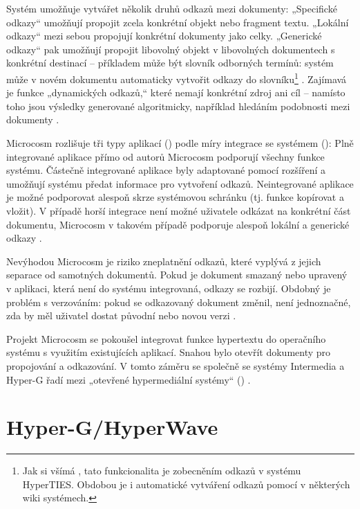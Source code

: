 Systém umožňuje vytvářet několik druhů odkazů mezi dokumenty: „Specifické odkazy“ umožňují propojit zcela konkrétní objekt nebo fragment  textu. „Lokální odkazy“ mezi sebou propojují konkrétní dokumenty jako celky. „Generické odkazy“ pak umožňují propojit libovolný objekt v libovolných dokumentech s konkrétní destinací -- příkladem může být slovník odborných termínů: systém může v novém dokumentu automaticky vytvořit odkazy do slovníku\footnote{Jak si všímá \textcite[31]{Muller-Prove2002}, tato funkcionalita je zobecněním odkazů v systému HyperTIES. Obdobou je i automatické vytváření odkazů pomocí  v některých wiki systémech.}
\autocites[184]{Davis1992}[4]{Fountain1990}. Zajímavá je funkce „dynamických odkazů,“ které nemají konkrétní zdroj ani cíl -- namísto toho jsou výsledky generované algoritmicky, například hledáním podobnosti mezi dokumenty \autocite[31]{Muller-Prove2002}.

Microcosm rozlišuje tři typy aplikací () podle míry integrace se systémem (): Plně integrované aplikace přímo od autorů Microcosm podporují všechny funkce systému. Částečně integrované aplikace byly adaptované pomocí rozšíření a umožňují systému předat informace pro vytvoření odkazů. Neintegrované aplikace je možné podporovat alespoň skrze systémovou schránku (tj. funkce kopírovat a vložit). V případě horší integrace není možné uživatele odkázat na konkrétní část dokumentu, Microcosm v takovém případě podporuje alespoň lokální a generické odkazy \autocite[185--186]{Davis1992}.

Nevýhodou Microcosm je riziko zneplatnění odkazů, které vyplývá z jejich separace od samotných dokumentů. Pokud je dokument smazaný nebo upravený v aplikaci, která není do systému integrovaná, odkazy se rozbijí. Obdobný je problém s verzováním: pokud se odkazovaný dokument změnil, není jednoznačné, zda by měl uživatel dostat původní nebo novou verzi \autocite[188--189]{Davis1992}.

Projekt Microcosm se pokoušel integrovat funkce hypertextu do operačního systému s využitím existujících aplikací. Snahou bylo otevřít dokumenty pro propojování a odkazování. V tomto záměru se společně se systémy Intermedia a Hyper-G řadí mezi „otevřené hypermediální systémy“ () \autocite[43]{Muller-Prove2002}. 

\section{Hyper-G/HyperWave}
\label{sec:hyperg}

